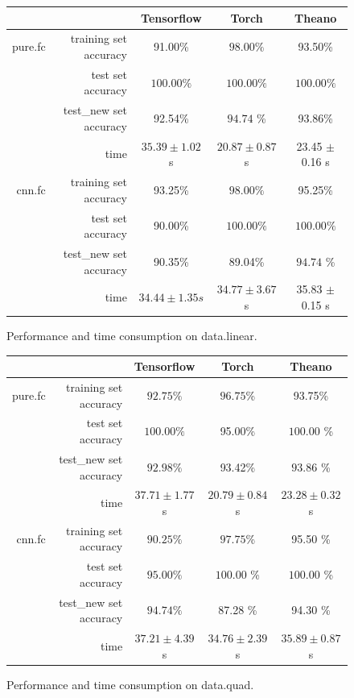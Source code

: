 \documentclass[a4paper]{article}
\begin{document}
\begin{figure}[H]
\centering
\begin{tabular}{|r|r|c|c|c|}
\hline
 & & Tensorflow & Torch & Theano \\
\hline
pure.fc & training set accuracy & 91.00\% & $\bm{98.00\%}$ & 93.50\% \\
 & test set accuracy & $\bm{100.00\%}$ & $\bm{100.00\%}$ & $\bm{100.00\%}$ \\
 & test\_new set accuracy & 92.54\% & $\bm{94.74}$ \% & 93.86\%\\
 & time & $35.39 \pm 1.02$ s & $\bm{20.87 \pm 0.87}$ s & 23.45 $\pm$ 0.16 s \\
\hline
cnn.fc & training set accuracy & 93.25\% & $\bm{98.00\%}$ & 95.25\% \\
 & test set accuracy & 90.00\% & $\bm{100.00\%}$ & $\bm{100.00\%}$ \\
 & test\_new set accuracy & 90.35\% & 89.04\% & $\bm{94.74}$ \% \\
 & time & $\bm{34.44 \pm 1.35} s$ & $34.77 \pm 3.67$s & 35.83 $\pm$ 0.15 s\\
\hline
\end{tabular}
\caption{Performance and time consumption on data.linear.}
\end{figure}

\begin{figure}[H]
\centering
\begin{tabular}{|r|r|c|c|c|}
\hline
 & & Tensorflow & Torch & Theano \\
\hline
pure.fc & training set accuracy & $92.75\%$ & $\bm{96.75}$\% & 93.75\% \\
 & test set accuracy & $\bm{100.00}\%$ & 95.00\% & $\bm{100.00}$ \% \\
 & test\_new set accuracy & $92.98\%$ & 93.42\% & $\bm{93.86}$ \% \\
 & time & $37.71\pm1.77$s & $\bm{20.79 \pm 0.84}$ s & $23.28 \pm 0.32$s\\
\hline
cnn.fc & training set accuracy & $90.25\%$ & $\bm{97.75}$\% & 95.50 \% \\
 & test set accuracy & $95.00\%$ & $\bm{100.00}$ \% & $\bm{100.00}$ \% \\
 & test\_new set accuracy & $\bm{94.74}\%$ & 87.28 \% & 94.30 \% \\
 & time & $37.21\pm4.39$s & $\bm{34.76 \pm 2.39}$ s & $ 35.89 \pm 0.87$ s\\
\hline
\end{tabular}
\caption{Performance and time consumption on data.quad.}
\end{figure}
\end{document}
